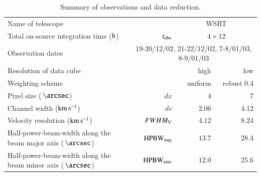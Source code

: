 \documentclass[oldversion]{aa}
\begin{document}
\begin{table}[htbp]
\caption{Summary of observations and data reduction.}
\label{Tab_2}
\begin{center}
\begin{tabular}{l r r r}
\hline
\hline
Name of telescope                                                                                 &                                             & \multicolumn{2}{c}{WSRT}            \\
Total on-source integration time ($\rm h$)                                                        & $t_{\rm obs}$                               & \multicolumn{2}{c}{$4\times 12$}    \\
Observation dates                                                                                 &                                             \multicolumn{3}{c}{19-20/12/02, 21-22/12/02, 7-8/01/03, 8-9/01/03}     \\
\hline                                                                           
Resolution of data cube                                                                           &                                             & high            & low                 \\
\hline                                                                           
Weighting scheme                                                                                  &                                             & uniform         & robust 0.4          \\
Pixel size ($\,\arcsec$)                                                                          & $dx$                                        & $ 4     $       & $ 7     $           \\
Channel width (${\rm km}\,{{\rm s}^{-1}}$)                                                        & $dv$                                        & $ 2.06  $       & $ 4.12  $           \\
Velocity resolution (${\rm km}\,{{\rm s}^{-1}}$)                                                  & $FWHM_{\rm V}$                              & $ 4.12  $       & $ 8.24  $           \\
Half-power-beam-width along the beam major axis ($\,\arcsec$)                                     & ${\rm HPBW}_{\rm maj}$                      & $ 13.7  $       & $ 28.4  $           \\
Half-power-beam-width along the beam minor axis ($\,\arcsec$)                                     & ${\rm HPBW}_{\rm min}$                      & $ 12.0  $       & $ 25.6  $           \\

\end{tabular}
\end{center}
\end{table}
\end{document}
